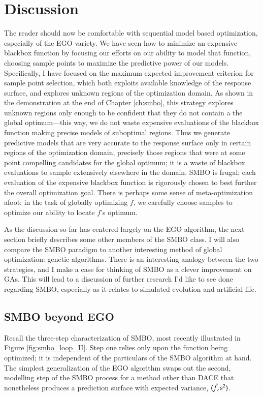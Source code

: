 \chapter{Discussion}\label{ch:discussion}

The reader should now be comfortable with sequential model based optimization, especially of the EGO variety. We have seen how to minimize an expensive blackbox function by focusing our efforts on our ability to model that function, choosing sample points to maximize the predictive power of our models. Specifically, I have focused on the maximum expected improvement criterion for sample point selection, which both exploits available knowledge of the response surface, and explores unknown regions of the optimization domain. As shown in the demonstration at the end of Chapter \ref{ch:smbo}, this strategy explores unknown regions only enough to be confident that they do not contain a the global optimum---this way, we do not waste expensive evaluations of the blackbox function making precise models of suboptimal regions. Thus we generate predictive models that are very accurate to the response surface only in certain regions of the optimization domain, precisely those regions that were at some point compelling candidates for the global optimum; it is a waste of blackbox evaluations to sample extensively elsewhere in the domain. SMBO is frugal; each evaluation of the expensive blackbox function is rigorously chosen to best further the overall optimization goal. There is perhaps some sense of meta-optimization afoot: in the task of globally optimizing $f$, we carefully choose samples to optimize our ability to locate $f$'s optimum.

As the discussion so far has centered largely on the EGO algorithm, the next section briefly describes some other members of the SMBO class. I will also compare the SMBO paradigm to another interesting method of global optimization: genetic algorithms. There is an interesting analogy between the two strategies, and I make a case for thinking of SMBO as a clever improvement on GAs. This will lead to a discussion of further research I'd like to see done regarding SMBO, especially as it relates to simulated evolution and artificial life.

\section{SMBO beyond EGO}\label{sec:next_smbo}

Recall the three-step characterization of SMBO, most recently illustrated in Figure \ref{fig:smbo_loop_II}. Step one relies only upon the function being optimized; it is independent of the particulars of the SMBO algorithm at hand. The simplest generalization of the EGO algorithm swaps out the second, modelling step of the SMBO process for a method other than DACE that nonetheless produces a prediction surface with expected variance, $(\hat{f},s^2)$.

